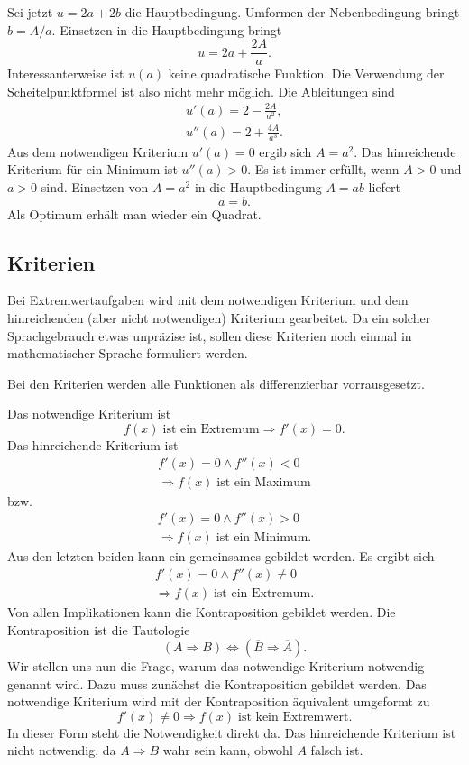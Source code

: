 \documentclass[a4paper,11pt,fleqn,twocolumn]{article}
\begin{document}
Sei jetzt \(u=2a+2b\) die Hauptbedingung. Umformen der Nebenbedingung
bringt \(b=A/a\). Einsetzen in die Hauptbedingung bringt
\[u=2a+\frac{2A}{a}.\]
Interessanterweise ist \(u(a)\) keine quadratische Funktion.
Die Verwendung der Scheitelpunktformel ist also nicht mehr möglich.
Die Ableitungen sind
\begin{gather*}
u'(a) = 2-\frac{2A}{a^2},\\
u''(a) = 2+\frac{4A}{a^3}.
\end{gather*}
Aus dem notwendigen Kriterium \(u'(a)=0\) ergib sich
\(A=a^2\). Das hinreichende Kriterium für ein Minimum ist
\(u''(a)>0\). Es ist immer erfüllt, wenn \(A>0\) und \(a>0\) sind.
Einsetzen von \(A=a^2\) in die Hauptbedingung \(A=ab\) liefert
\[a=b.\]
Als Optimum erhält man wieder ein Quadrat.


\subsection*{Kriterien}

Bei Extremwertaufgaben wird mit dem notwendigen Kriterium und
dem hinreichenden (aber nicht notwendigen) Kriterium gearbeitet.
Da ein solcher Sprachgebrauch etwas unpräzise ist, sollen diese
Kriterien noch einmal in mathematischer Sprache formuliert werden.

Bei den Kriterien werden alle Funktionen als differenzierbar
vorrausgesetzt.

Das notwendige Kriterium ist
\[f(x)\;\text{ist ein Extremum}\Rightarrow f'(x)=0.\]
Das hinreichende Kriterium ist
\begin{gather*}
f'(x)=0\wedge f''(x)<0\\
\Rightarrow f(x)\;\text{ist ein Maximum}
\end{gather*}
bzw.
\begin{gather*}
f'(x)=0\wedge f''(x)>0\\
\Rightarrow f(x)\;\text{ist ein Minimum}.
\end{gather*}
Aus den letzten beiden kann ein gemeinsames gebildet werden.
Es ergibt sich
\begin{gather*}
f'(x)=0\wedge f''(x)\ne 0\\
\Rightarrow f(x)\;\text{ist ein Extremum}.
\end{gather*}
Von allen Implikationen kann die Kontraposition gebildet werden.
Die Kontraposition ist die Tautologie
\[(A\Rightarrow B) \Leftrightarrow
(\overline B\Rightarrow\overline A).\]
Wir stellen uns nun die Frage, warum das notwendige Kriterium
{\glqq}notwendig{\grqq} genannt wird. Dazu muss zunächst die Kontraposition
gebildet werden. Das notwendige Kriterium wird mit der Kontraposition
äquivalent umgeformt zu
\[f'(x)\ne 0\Rightarrow f(x)\;\text{ist kein Extremwert}.\]
In dieser Form steht die Notwendigkeit direkt da.
Das hinreichende Kriterium ist nicht notwendig, da \(A\Rightarrow B\)
wahr sein kann, obwohl \(A\) falsch ist.
\end{document}
